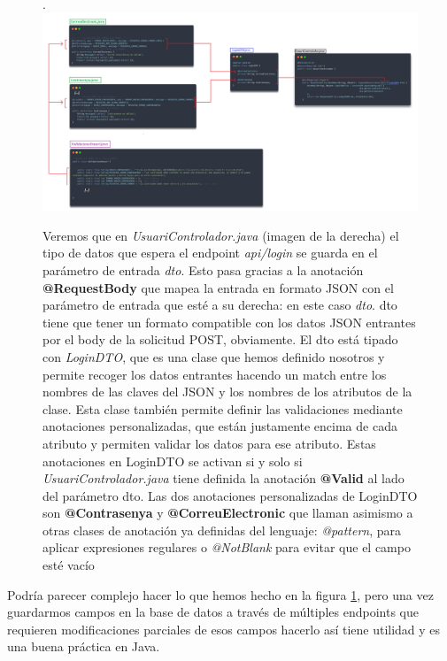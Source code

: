 \documentclass[a4paper,12pt]{report}
\begin{document}
			\FloatBarrier
			\setlength{\belowcaptionskip}{3pt}
			\begin{figure}[H]
				\centering
				\caption{Veremos que en \textit{UsuariControlador.java} (imagen de la derecha) el tipo de datos que espera el endpoint \textit{api/login} se guarda en el parámetro de entrada \textit{dto}. Esto pasa gracias a la anotación \textbf{@RequestBody} que mapea la entrada en formato JSON con el parámetro de entrada que esté a su derecha: en este caso \textit{dto}. dto tiene que tener un formato compatible con los datos JSON entrantes por el body de la solicitud POST, obviamente. El dto está tipado con \textit{LoginDTO}, que es una clase que hemos definido nosotros y permite recoger los datos entrantes hacendo un match entre los nombres de las claves del JSON y los nombres de los atributos de la clase. Esta clase también permite definir las validaciones mediante anotaciones personalizadas, que están justamente encima de cada atributo y permiten validar los datos para ese atributo. Estas anotaciones en LoginDTO se activan si y solo si \textit{UsuariControlador.java} tiene definida la anotación \textbf{@Valid} al lado del parámetro dto. Las dos anotaciones personalizadas de LoginDTO son \textbf{@Contrasenya} y \textbf{@CorreuElectronic} que llaman asimismo a otras clases de anotación ya definidas del lenguaje: \textit{@pattern}, para aplicar expresiones regulares o \textit{@NotBlank} para evitar que el campo esté vacío}.
				\includegraphics[width=1\linewidth]{img/validacioBackArxiusDetallLoginVB}
				\label{fig:validacioBackArxiusDetallLoginVB}
			\end{figure}
			\FloatBarrier
			
		
			Podría parecer complejo hacer lo que hemos hecho en la figura \ref{fig:validacioBackArxiusDetallLoginVB}, pero una vez guardarmos campos en la base de datos a través de múltiples endpoints que requieren modificaciones parciales de esos campos hacerlo así tiene utilidad y es una buena práctica en Java.
			
\end{document}
